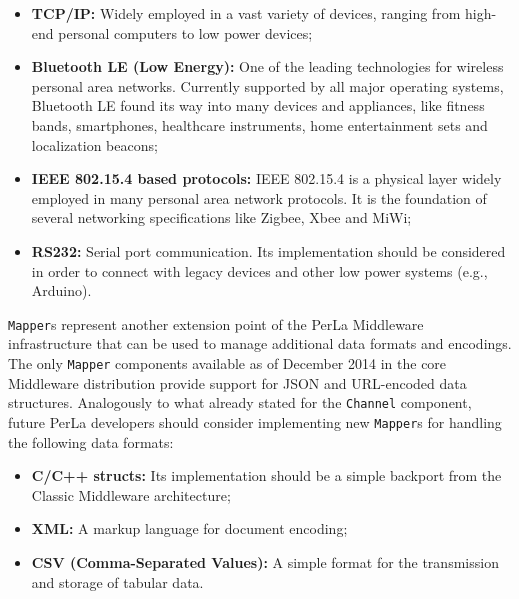 \begin{itemize}

    \item \textbf{TCP/IP:} Widely employed in a vast variety of devices,
    ranging from high-end personal computers to low power devices;

\item \textbf{Bluetooth LE (Low Energy):} One of the leading technologies for
    wireless personal area networks. Currently supported by all major operating
    systems, Bluetooth LE found its way into many devices and appliances, like
    fitness bands, smartphones, healthcare instruments, home entertainment sets
    and localization beacons;

    \item \textbf{IEEE 802.15.4 based protocols:} IEEE 802.15.4 is a physical
    layer widely employed in many personal area network protocols. It is the
    foundation of several networking specifications like Zigbee, Xbee and MiWi;

    \item \textbf{RS232:} Serial port communication. Its implementation should
    be considered in order to connect with legacy devices and other low power
    systems (e.g., Arduino).

\end{itemize}

\texttt{Mapper}s represent another extension point of the PerLa Middleware
infrastructure that can be used to manage additional data formats and
encodings. The only \texttt{Mapper} components available as of December 2014 in
the core Middleware distribution provide support for JSON and URL-encoded data
structures. Analogously to what already stated for the \texttt{Channel}
component, future PerLa developers should consider implementing new
\texttt{Mapper}s for handling the following data formats:

\begin{itemize}

    \item \textbf{C/C++ structs:} Its implementation should be a simple
    backport from the Classic Middleware architecture;

    \item \textbf{XML:} A markup language for document encoding;

    \item \textbf{CSV (Comma-Separated Values):} A simple format for the
    transmission and storage of tabular data.

\end{itemize}

